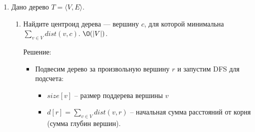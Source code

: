 \begin{enumerate}
\begin{enumerate}
\begin{itemize}
        Это означает, что из поддерева $y$ (содержащего $b$) нет обратных рёбер, ведущих к предкам вершины $x$.

        \item Финальный алгоритм:
        \begin{enumerate}
          \item Запустить DFS из $a$, вычисляя $enter$, $ret$ и сохраняя $parent$
          \item Восстановить путь $a \leadsto b$ по массиву $parent$
          \item Для каждой вершины $x$ на пути (кроме $a$ и $b$): если $ret(y) \geq enter(x)$, где $y$ -- следующая вершина пути, то $x$ -- искомая вершина
        \end{enumerate}

        \item Сложность по времени:
        \begin{itemize}
          \item DFS для вычисления $enter$, $ret$, $parent$ -- $\O(|V| + |E|)$
          \item Восстановление пути и проверка вершин -- $\O(|V|)$
        \end{itemize}
        
        Итого: $\O(|V| + |E|)$
        
        \item Сложность по памяти: $\O(|V|)$ -- массивы $enter$, $ret$, $parent$
      
      \end{itemize}

    \end{enumerate}

  \item
    Дано дерево $T = \langle V, E \rangle$.
    \begin{enumerate}
      \item
        Найдите центроид дерева --- вершину $c$, для которой минимальна \\
        $\sum_{v \in V} dist(v, c)$. $\O(|V|)$.

        Решение:

        \begin{itemize}
          
          \item Подвесим дерево за произвольную вершину $r$ и запустим DFS для подсчета:
          \begin{itemize}
            \item $size[v]$ -- размер поддерева вершины $v$
            \item $d[r] = \sum_{v \in V} dist(v, r)$ -- начальная сумма расстояний от корня (сумма глубин вершин).
          \end{itemize}


\end{itemize}
\end{enumerate}
\end{enumerate}
